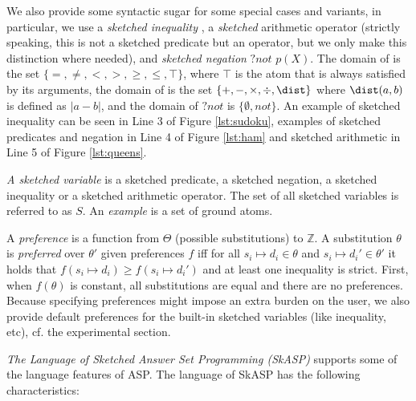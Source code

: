 We also provide some syntactic sugar for some special cases and variants,
in particular, we use a {\em sketched inequality} \sketchedeq, a  {\em sketched} arithmetic operator \sketchedplus (strictly speaking, this is not a sketched predicate but an operator, but we only make this distinction where needed), and {\em sketched negation} ${?}\textit{not } p(X)$.  The domain of \sketchedeq is the set $\{=,\neq,<,>,\geq,\leq,\top\}$, where $\top$ is the atom that is always satisfied by its arguments, the domain of \sketchedplus is the set $\{ +, -, \times, \div, \dist \}$ where $\dist(a,b)$ is defined as $| a - b |$, and the domain of ${?}\textit{not}$  is $\{\emptyset, not\}$. An example of sketched inequality can be seen in Line 3 of Figure \ref{lst:sudoku}, examples of sketched predicates and negation in Line 4 of Figure \ref{lst:ham} and sketched arithmetic in Line 5 of Figure \ref{lst:queens}.


\textit{A sketched variable} is a sketched predicate, a sketched negation, a sketched inequality or a sketched arithmetic operator. The set of all sketched variables is referred to  as $S$. 
An \textit{example} is a set of ground atoms. 

A \textit{preference} is a function from $\Theta$ (possible substitutions) to $\mathbb{Z}$. A substitution $\theta$ is \textit{preferred} over $\theta'$ given preferences $f$ iff for all $s_i \mapsto d_i \in \theta$ and $s_{i} \mapsto d_{i}' \in \theta'$ it holds that $f(s_i \mapsto d_i) \geq f(s_i \mapsto d_{i}')$ and at least one inequality is strict. First, when $f(\theta)$ is constant,
all substitutions are equal and there are no preferences. Because specifying preferences might impose an extra burden on the user, we also provide default preferences for the built-in sketched variables (like inequality, etc), cf. the experimental section.

\textit{The Language of Sketched Answer Set Programming (SkASP)}
supports some of the language features of ASP. 
The language of SkASP has the following characteristics:

